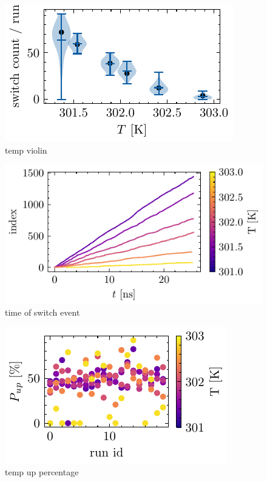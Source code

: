 \documentclass[main.tex]{subfiles}
\begin{document}
\begin{figure}[H]
    \centering
    \includegraphics{bilder/plots/temp_comparison/switch_count_violin.pdf}
    \caption{temp violin}\label{fig:temp-violin}
\end{figure}

\begin{figure}[H]
    \centering
    \includegraphics{bilder/plots/temp_comparison/switch_events.pdf}
    \caption{time of switch event}\label{fig:switch-events}
\end{figure}

\begin{figure}[H]
    \centering
    \includegraphics{bilder/plots/temp_comparison/up_percentage_scatter.pdf}
    \caption{temp up percentage}\label{fig:temp-up-percentage}
\end{figure}
\end{document}

